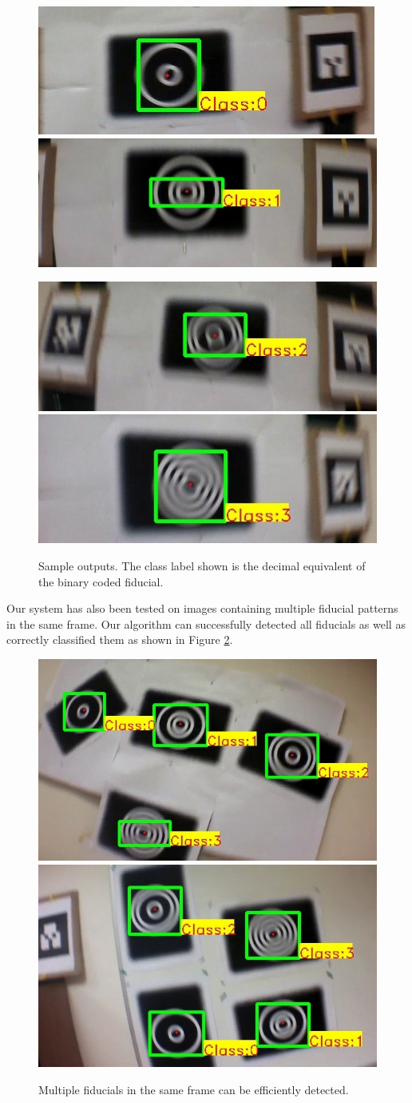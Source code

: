 \documentclass[10pt,twocolumn,letterpaper]{article}
\begin{document}
\begin{figure}[h!]
\centering
  \includegraphics[width=0.4\linewidth]{images/output_00.jpg}
  \includegraphics[width=0.4\linewidth]{images/output_01.jpg}

  \includegraphics[width=0.4\linewidth]{images/output_10.jpg}
  \includegraphics[width=0.4\linewidth]{images/output_11.jpg}
  \caption{Sample outputs. The class label shown is the decimal equivalent
  of the binary coded fiducial.}
  \label{fig:out_outputs}
\end{figure}

Our system has also been tested on images containing multiple fiducial
patterns in the same frame. Our algorithm can successfully detected
all fiducials as well as correctly classified them as shown in
Figure \ref{fig:output_all}.

\begin{figure}[ht!]
\centering
  \includegraphics[width=.45\linewidth]{images/output_all_2.jpg}
  \includegraphics[width=.45\linewidth]{images/new_results/output_test_all1.jpg}
  \caption{Multiple fiducials in the same frame can be efficiently
    detected. }
  \label{fig:output_all}
\end{figure}
\end{document}
